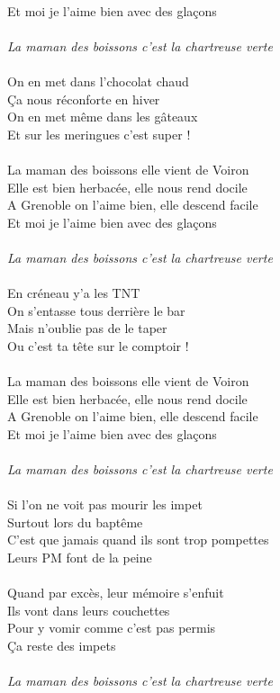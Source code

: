 \\Et moi je l'aime bien avec des glaçons 
\\\\\textit{La maman des boissons c'est la chartreuse verte}
\\\\On en met dans l'chocolat chaud
\\Ça nous réconforte en hiver
\\On en met même dans les gâteaux
\\Et sur les meringues c'est super !
\\\\La maman des boissons elle vient de Voiron 
\\Elle est bien herbacée, elle nous rend docile 
\\A Grenoble on l'aime bien, elle descend facile 
\\Et moi je l'aime bien avec des glaçons 
\\\\\textit{La maman des boissons c'est la chartreuse verte}
\\\\En créneau y'a les TNT 
\\On s'entasse tous derrière le bar 
\\Mais n'oublie pas de le taper 
\\Ou c'est ta tête sur le comptoir !
\\\\La maman des boissons elle vient de Voiron 
\\Elle est bien herbacée, elle nous rend docile 
\\A Grenoble on l'aime bien, elle descend facile 
\\Et moi je l'aime bien avec des glaçons 
\\\\\textit{La maman des boissons c'est la chartreuse verte}
\\\\Si l'on ne voit pas mourir les impet 
\\Surtout lors du baptême 
\\C'est que jamais quand ils sont trop pompettes
\\Leurs PM font de la peine 
\\\\Quand par excès, leur mémoire s'enfuit
\\Ils vont dans leurs couchettes
\\Pour y vomir comme c'est pas permis
\\Ça reste des impets 
\\\\\textit{La maman des boissons c'est la chartreuse verte}

\breakpage
